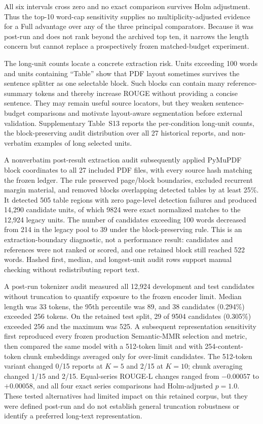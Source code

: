 \documentclass[information,article,submit,moreauthors]{Definitions/mdpi}
\begin{document}
All six intervals cross zero and no exact comparison survives Holm adjustment. Thus the top-10 word-cap sensitivity supplies no multiplicity-adjusted evidence for a Full advantage over any of the three principal comparators. Because it was post-run and does not rank beyond the archived top ten, it narrows the length concern but cannot replace a prospectively frozen matched-budget experiment.

The long-unit counts locate a concrete extraction risk. Units exceeding 100 words and units containing ``Table'' show that PDF layout sometimes survives the sentence splitter as one selectable block. Such blocks can contain many reference-summary tokens and thereby increase ROUGE without providing a concise sentence. They may remain useful source locators, but they weaken sentence-budget comparisons and motivate layout-aware segmentation before external validation. Supplementary Table~S13 reports the per-condition long-unit counts, the block-preserving audit distribution over all 27 historical reports, and non-verbatim examples of long selected units.

A nonverbatim post-result extraction audit subsequently applied PyMuPDF block coordinates to all 27 included PDF files, with every source hash matching the frozen ledger. The rule preserved page/block boundaries, excluded recurrent margin material, and removed blocks overlapping detected tables by at least 25\%. It detected 505 table regions with zero page-level detection failures and produced 14,290 candidate units, of which 9824 were exact normalized matches to the 12,924 legacy units. The number of candidates exceeding 100 words decreased from 214 in the legacy pool to 39 under the block-preserving rule. This is an extraction-boundary diagnostic, not a performance result: candidates and references were not ranked or scored, and one retained block still reached 522 words. Hashed first, median, and longest-unit audit rows support manual checking without redistributing report text.

A post-run tokenizer audit measured all 12,924 development and test candidates without truncation to quantify exposure to the frozen encoder limit. Median length was 33 tokens, the 95th percentile was 89, and 38 candidates (0.294\%) exceeded 256 tokens. On the retained test split, 29 of 9504 candidates (0.305\%) exceeded 256 and the maximum was 525. A subsequent representation sensitivity first reproduced every frozen production Semantic-MMR selection and metric, then compared the same model with a 512-token limit and with 254-content-token chunk embeddings averaged only for over-limit candidates. The 512-token variant changed 0/15 reports at $K=5$ and 2/15 at $K=10$; chunk averaging changed 1/15 and 2/15. Equal-series ROUGE-L changes ranged from $-0.00057$ to $+0.00058$, and all four exact series comparisons had Holm-adjusted $p=1.0$. These tested alternatives had limited impact on this retained corpus, but they were defined post-run and do not establish general truncation robustness or identify a preferred long-text representation.
\end{document}
